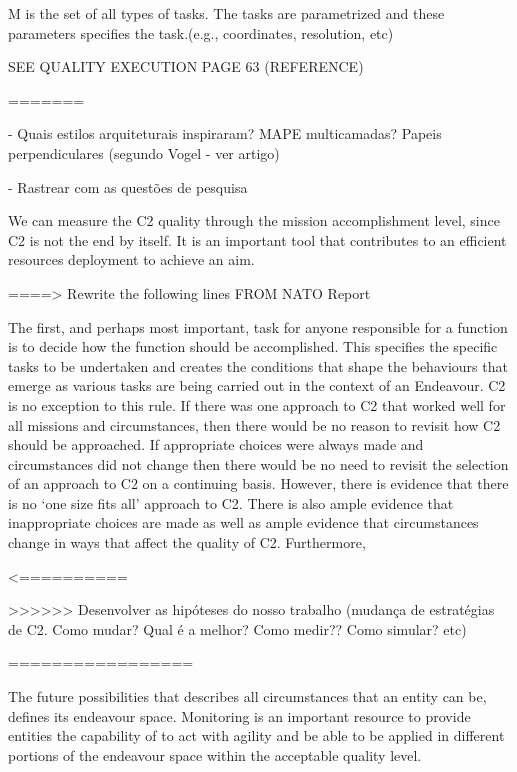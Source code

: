 
M is the set of all types of tasks. The tasks are parametrized and these parameters specifies the task.(e.g., coordinates, resolution, etc)


SEE QUALITY EXECUTION PAGE 63 (REFERENCE)

=======

- Quais estilos arquiteturais inspiraram? MAPE multicamadas? Papeis perpendiculares (segundo Vogel - ver artigo)

- Rastrear com as questões de pesquisa








We can measure the C2 quality through the mission accomplishment level, since C2 is not the end by itself. It is an important tool that contributes to an efficient resources deployment to achieve an aim.


====> Rewrite the following lines FROM NATO Report \cite{FRANCE2014}

The first, and perhaps most important, task for anyone responsible for a function is to decide how the function should be accomplished. This specifies the specific tasks to be undertaken and creates the conditions that shape the behaviours that emerge as various tasks are being carried out in the context of an Endeavour.
C2 is no exception to this rule. If there was one approach to C2 that worked well for all missions and
circumstances, then there would be no reason to revisit how C2 should be approached. If appropriate choices were always made and circumstances did not change then there would be no need to revisit the selection of an approach to C2 on a continuing basis. However, there is evidence that there is no ‘one size fits all’ approach to C2. There is also ample evidence that inappropriate choices are made as well as ample evidence that circumstances change in ways that affect the quality of C2.
Furthermore,

<==========







>>>>>> Desenvolver as hipóteses do nosso trabalho (mudança de estratégias de C2. Como mudar? Qual é a melhor? Como medir?? Como simular? etc)



=================





The future possibilities that describes all circumstances that an entity can be, defines its endeavour space. Monitoring is an important resource to provide entities the capability of to act with agility and be able to be applied in different portions of the endeavour space within the acceptable quality level. 



